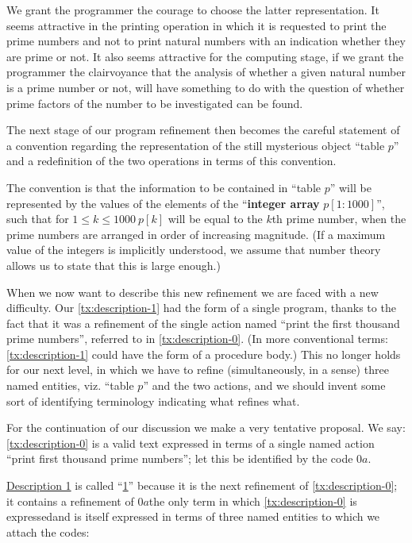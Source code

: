 \documentclass[twoside,11pt]{book}
\begin{document}
We grant the programmer the courage to choose the latter representation. It seems attractive in the printing operation in which it is requested to print the prime numbers and not to print natural numbers with an indication whether they are prime or not. It also seems attractive for the computing stage, if we grant the programmer the clairvoyance that the analysis of whether a given natural number is a prime number or not, will have something to do with the question of whether prime factors of the number to be investigated can be found.

The next stage of our program refinement then becomes the careful statement of a convention regarding the representation of the still mysterious object ``table $p$'' and a redefinition of the two operations in terms of this convention.

The convention is that the information to be contained in ``table $p$'' will be represented by the values of the elements of the ``\textbf{integer array} $p[1 : 1000]$'', such that for $1 \leqslant k \leqslant 1000\ p[k]$ will be equal to the $k$th prime number, when the prime numbers are arranged in order of increasing magnitude. (If a maximum value of the integers is implicitly understood, we assume that number theory allows us to state that this is large enough.)

When we now want to describe this new refinement we are faced with a new difficulty. Our \ref{tx:description-1} had the form of a single program, thanks to the fact that it was a refinement of the single action named ``print the first thousand prime numbers'', referred to in \ref{tx:description-0}. (In more conventional terms: \ref{tx:description-1} could have the form of a procedure body.) This no longer holds for our next level, in which we have to refine (simultaneously, in a sense) three named entities, viz. ``table $p$'' and the two actions, and we should invent some sort of identifying terminology indicating what refines what.

For the continuation of our discussion we make a very tentative proposal. We say: \ref{tx:description-0} is a valid text expressed in terms of a single named action ``print first thousand prime numbers''; let this be identified by the code $0a$.

\hyperref[tx:description-1]{Description 1} is called ``\hyperref[tx:description-1]{1}'' because it is the next refinement of \ref{tx:description-0}; it contains a refinement of $0a$\textemdash{}the only term in which \ref{tx:description-0} is expressed\textemdash{}and is itself expressed in terms of three named entities to which we attach the codes:
\end{document}
